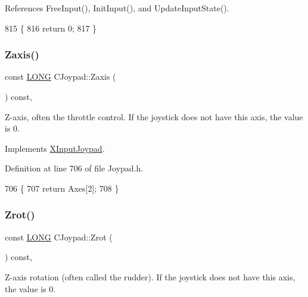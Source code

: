 References Free\+Input(), Init\+Input(), and Update\+Input\+State().


\begin{DoxyCode}
815                                                  \{
816         \textcolor{keywordflow}{return} 0;
817     \}
\end{DoxyCode}
\mbox{\label{class_c_joypad_a1ab390e90331bc036447eb4fc477e796}} 
\subsubsection{\texorpdfstring{Zaxis()}{Zaxis()}}
{\footnotesize\ttfamily const \hyperlink{_joypad_8h_a2a3e0cda5f1249bef6db47c5eb8e3813}{L\+O\+NG} C\+Joypad\+::\+Zaxis (\begin{DoxyParamCaption}{ }\end{DoxyParamCaption}) const\hspace{0.3cm}{\ttfamily [inline]}, {\ttfamily [virtual]}}

Z-\/axis, often the throttle control. If the joystick does not have this axis, the value is 0. 

Implements \hyperlink{struct_x_input_joypad_af4bfca4d8f22808a92a0ae26468cdedc}{X\+Input\+Joypad}.



Definition at line 706 of file Joypad.\+h.


\begin{DoxyCode}
706                              \{
707         \textcolor{keywordflow}{return} Axes[2];
708     \}
\end{DoxyCode}
\mbox{\label{class_c_joypad_a4cd374af62d1380af4f92156503330a7}} 
\subsubsection{\texorpdfstring{Zrot()}{Zrot()}}
{\footnotesize\ttfamily const \hyperlink{_joypad_8h_a2a3e0cda5f1249bef6db47c5eb8e3813}{L\+O\+NG} C\+Joypad\+::\+Zrot (\begin{DoxyParamCaption}{ }\end{DoxyParamCaption}) const\hspace{0.3cm}{\ttfamily [inline]}, {\ttfamily [virtual]}}

Z-\/axis rotation (often called the rudder). If the joystick does not have this axis, the value is 0. 

